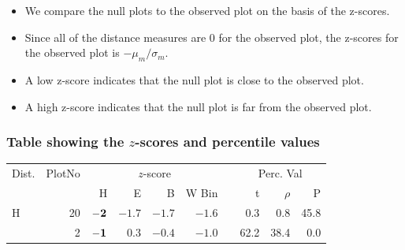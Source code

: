 \documentclass{beamer}
\begin{document}
\begin{frame}
\begin{itemize}
\item We compare the null plots to the observed plot on the basis of the z-scores.
\item Since all of the distance measures are 0 for the observed plot, the z-scores for the observed plot is $- \mu_m/ \sigma_m$.
\item A low z-score indicates that the null plot is close to the observed plot.
\item A high z-score indicates that the null plot is far from the observed plot.
\end{itemize}
\end{frame}

\begin{frame}
\frametitle{Table showing the $z$-scores and percentile values}
\begin{table}[hbt]
	\vspace{-.4in}
%
\centering  %
\begin{tabular}{l r rrrr r rrr}  %
\hline                       %
Dist. & PlotNo &\multicolumn{4}{c}{$z$-score} & &\multicolumn{3}{c}{Perc. Val} \\ [0.5ex]   
 \cline{1-1}\cline{3-6}\cline{8-10}
 & & H & E & B & W Bin & & t & $\rho$ & P   \\     [0.5ex]
\hline
H  & 20 & $\bf -2$ & $-1.7$ & $-1.7$ & $-1.6$ & & 0.3 & 0.8 & 45.8 \\[-0.5ex]
 & 2 & $\bf -1$ & 0.3 & $-0.4$ & $-1.0$ & & 62.2 & 38.4 & 0.0\\[-0.5ex]


\end{tabular}
\end{table}
\end{frame}
\end{document}
